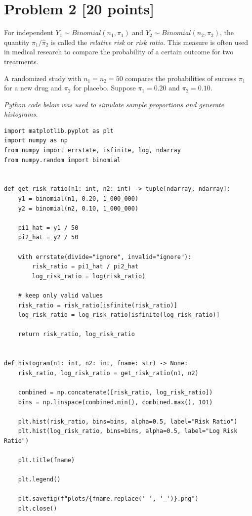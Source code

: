 \documentclass[12pt]{article}
\begin{document}
\section*{Problem 2 [20 points]}

For independent $Y_1 \sim Binomial(n_1,\pi_1)$ and $Y_2 \sim Binomial(n_2,\pi_2)$, the quantity $\hat{\pi}_1/\hat{\pi}_2$ is called the \textit{relative risk} or \textit{risk ratio}. This measure is often used in medical research to compare the probability of a certain outcome for two treatments.

A randomized study with $n_1=n_2=50$ compares the probabilities of success $\pi_1$ for a new drug and $\pi_2$ for placebo. Suppose $\pi_1=0.20$ and $\pi_2=0.10$.

\vspace{1cm}
\textit{Python code below was used to simulate sample proportions and generate histograms.}
\begin{lstlisting}
import matplotlib.pyplot as plt
import numpy as np
from numpy import errstate, isfinite, log, ndarray
from numpy.random import binomial


def get_risk_ratio(n1: int, n2: int) -> tuple[ndarray, ndarray]:
    y1 = binomial(n1, 0.20, 1_000_000)
    y2 = binomial(n2, 0.10, 1_000_000)

    pi1_hat = y1 / 50
    pi2_hat = y2 / 50

    with errstate(divide="ignore", invalid="ignore"):
        risk_ratio = pi1_hat / pi2_hat
        log_risk_ratio = log(risk_ratio)

    # keep only valid values
    risk_ratio = risk_ratio[isfinite(risk_ratio)]
    log_risk_ratio = log_risk_ratio[isfinite(log_risk_ratio)]

    return risk_ratio, log_risk_ratio


def histogram(n1: int, n2: int, fname: str) -> None:
    risk_ratio, log_risk_ratio = get_risk_ratio(n1, n2)

    combined = np.concatenate([risk_ratio, log_risk_ratio])
    bins = np.linspace(combined.min(), combined.max(), 101)

    plt.hist(risk_ratio, bins=bins, alpha=0.5, label="Risk Ratio")
    plt.hist(log_risk_ratio, bins=bins, alpha=0.5, label="Log Risk Ratio")

    plt.title(fname)

    plt.legend()

    plt.savefig(f"plots/{fname.replace(' ', '_')}.png")
    plt.close()
\end{lstlisting}
\end{document}

